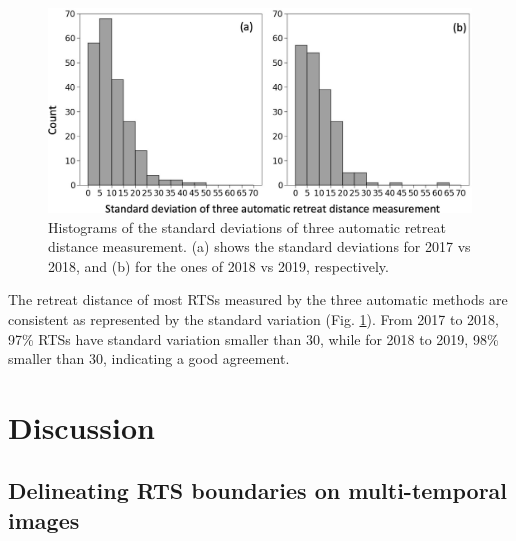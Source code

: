 \documentclass[authoryear,preprint,review,12pt]{elsarticle}
\begin{document}
\begin{figure} 
	\centering
	\includegraphics[width=14cm]{figs/standard_deviation_trim.jpg}
	\caption{Histograms of the standard deviations of three automatic retreat distance measurement. (a) shows the standard deviations for 2017 vs 2018, and (b) for the ones of 2018 vs 2019, respectively.}
	\label{fig_re_dis_standard_var}
\end{figure}

The retreat distance of most RTSs measured by the three automatic methods are consistent as represented by the standard variation (Fig. \ref{fig_re_dis_standard_var}).
From 2017 to 2018, 97\% RTSs have standard variation smaller than 30, while for 2018 to 2019, 98\% smaller than 30, indicating a good agreement. 

 

 

\section{Discussion}
\label{sec_discussion}

\subsection{Delineating RTS boundaries on multi-temporal images}
\label{sec_diss_mapping_rts_multi_images}
\end{document}
